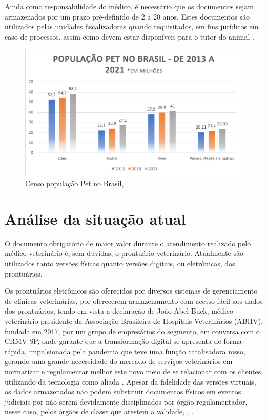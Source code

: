 \documentclass[
    12pt,               %
    openright,          %
    oneside,
    a4paper,            %
    BIBLATEX,           %
    TODO,               %
    english,            %
    brazil              %
    ]{ifsp-spo-inf-ctds}
\begin{document}
    Ainda como responsabilidade do médico, é necessário que os documentos sejam armazenados por um prazo pré-definido de 2 a 20 anos. Estes documentos são utilizados pelas unidades fiscalizadoras quando requisitados, em fins jurídicos em caso de processos, assim como devem estar disponíveis para o tutor do animal .

     \begin{figure}[H]
        \centering
        \includegraphics{images/grafico_censopet.png}
        \caption{Censo população Pet no Brasil, }
        \label{fig:grafico_pet}
    \end{figure}

    \section{Análise da situação atual} \label{analise_atual}

    O documento obrigatório de maior valor durante o atendimento realizado pelo médico veterinário é, sem dúvidas, o prontuário veterinário. Atualmente são utilizados tanto versões físicas quanto versões digitais, ou eletrônicas, dos prontuários.

    Os prontuários eletrônicos são oferecidos por diversos sistemas de gerenciamento de clínicas veterinárias, por oferecerem armazenamento com acesso fácil aos dados dos prontuários, tendo em vista a declaração de João Abel Buck, médico-veterinário presidente da Associação Brasileira de Hospitais Veterinários (ABHV), fundada em 2017, por um grupo de empresários do segmento, em conversa com o CRMV-SP, onde garante que a transformação digital se apresenta de forma rápida, impulsionada pela pandemia que teve uma função catalisadora nisso, gerando uma grande necessidade do mercado de serviços veterinários em normatizar e regulamentar melhor este novo meio de se relacionar com os clientes utilizando da tecnologia como aliada \cite{buck}. Apesar da fidelidade das versões virtuais, os dados armazenados não podem substituir documentos físicos em eventos judiciais por não serem devidamente disciplinados por órgão regulamentador, nesse caso, pelos órgãos de classe que atestem a validade, , .
\end{document}
